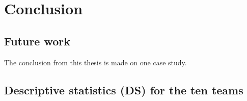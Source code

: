 \documentclass[UKenglish]{ifimaster}  %
\begin{document}
 
\chapter{Conclusion}
\label{ch:conc}


\section{Future work}
The conclusion from this thesis is made on one case study.  

\begin{appendices}
\chapter{Descriptive statistics (DS) for the ten teams}
\label{app:DS}
 

\end{appendices}
\end{document}
